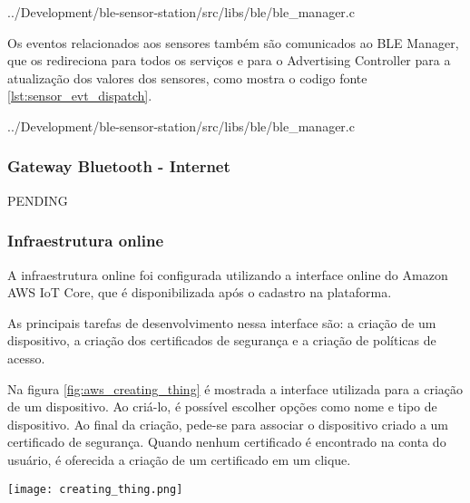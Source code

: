 \begin{minipage}{0.95\linewidth} 
 {../Development/ble-sensor-station/src/libs/ble/ble_manager.c}
\end{minipage}


Os eventos relacionados aos sensores também são comunicados ao BLE Manager, que
os redireciona para todos os serviços e para o Advertising Controller para a
atualização dos valores dos sensores, como mostra o codigo fonte
\ref{lst:sensor_evt_dispatch}.

\begin{minipage}{0.95\linewidth} 
 {../Development/ble-sensor-station/src/libs/ble/ble_manager.c}
\end{minipage}



\subsubsection{Gateway Bluetooth - Internet}
PENDING

\subsubsection{Infraestrutura online}

A infraestrutura online foi configurada utilizando a interface online do Amazon
AWS IoT Core, que é disponibilizada após o cadastro na plataforma.

As principais tarefas de desenvolvimento nessa interface são: a criação de um
dispositivo, a criação dos certificados de segurança e a criação de políticas de
acesso.

Na figura \ref{fig:aws_creating_thing} é mostrada a interface utilizada para a
criação de um dispositivo. Ao criá-lo, é possível escolher opções como nome
e tipo de dispositivo. Ao final da criação, pede-se para associar o dispositivo
criado a um certificado de segurança. Quando nenhum certificado é encontrado na
conta do usuário, é oferecida a criação de um certificado em um clique.

\begin{center}
	\centering 
	\texttt{[image: creating\_thing.png]}
	\label{fig:aws_creating_thing}
\end{center} 

